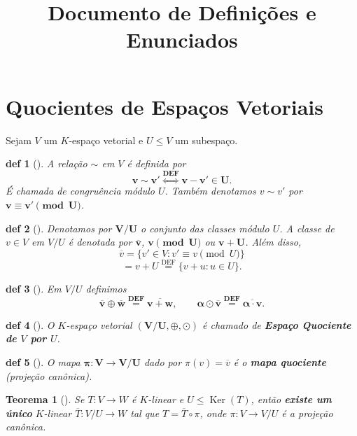 \documentclass[11pt]{article}
\DeclareMathOperator{\Ker}{Ker}   %
\newcommand{\defname}[1]{\colorbox{yellow!30}{\strut \textbf{#1}}}
\newtheorem*{theorem}{Teorema}
\newtheorem*{definition}{def}
\theoremstyle{definition}
\begin{document}
\title{Documento de Definições e Enunciados}
\author{}
\date{}



\section{Quocientes de Espaços Vetoriais}
\begin{multicols}{3}
Sejam $V$ um $K$-espaço vetorial e $U \le V$ um subespaço.



\begin{definition}[\defname{Relação de Congruência Módulo $U$}]
A relação $\sim$ em $V$ é definida por
\[
\mathbf{v \sim v' \stackrel{\text{DEF}}{\iff} v - v' \in U}.
\]
É chamada de congruência módulo $U$. Também denotamos $v \sim v'$ por \(\mathbf{v \equiv v' \pmod{U}}\).
\end{definition}

\begin{definition}[\defname{Classe Residual(ou de Equivalência)}]
Denotamos por \(\mathbf{V/U}\) o conjunto das classes módulo $U$. A classe de \(v \in V\) em \(V/U\) é denotada por \(\mathbf{\overline{v}}\), \(\mathbf{v \pmod{U}}\) ou \(\mathbf{v + U}\). Além disso,
\[
\overline{v} = \{v' \in V : v' \equiv v \pmod{U}\} 
\]
\[
= v + U \stackrel{\text{DEF}}{=} \{v + u : u \in U\}.
\]
\end{definition}

\begin{definition}[\defname{Operações no Espaço Quociente}]
Em \(V/U\) definimos
\[
\mathbf{\overline{v} \oplus \overline{w} \stackrel{\text{DEF}}{=} \overline{v + w}}, \qquad
\mathbf{\alpha \odot \overline{v} \stackrel{\text{DEF}}{=} \overline{\alpha \cdot v}}.
\]
\end{definition}

\begin{definition}[\defname{Espaço Quociente}]
O $K$-espaço vetorial \(\mathbf{(V/U,\oplus,\odot)}\) é chamado de \textbf{Espaço Quociente de $V$ por $U$}.
\end{definition}

\begin{definition}[\defname{Mapa Quociente (Projeção Canônica)}]
O mapa \(\mathbf{\pi: V \to V/U}\) dado por \(\pi(v)=\overline{v}\) é o \textbf{mapa quociente} (projeção canônica).
\end{definition}



\begin{theorem}[\defname{Propri. Universal do Quociente}]
Se $T:V\to W$ é $K$-linear e \(U \le \Ker(T)\), então \textbf{existe um único} $K$-linear \(\overline{T}:V/U\to W\) tal que \(T=\overline{T}\circ \pi\), onde \(\pi:V\to V/U\) é a projeção canônica.
\end{theorem}


\end{multicols}
\end{document}
